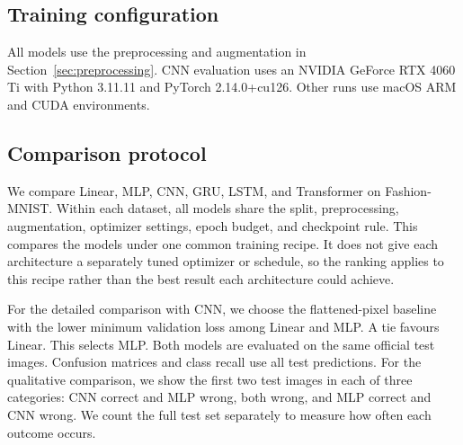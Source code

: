 \subsection{Training configuration}
\label{sec:training-setup}

All models use the preprocessing and augmentation in
Section~\ref{sec:preprocessing}. CNN evaluation uses an NVIDIA GeForce RTX 4060 Ti
with Python 3.11.11 and PyTorch 2.14.0+cu126. Other runs use macOS ARM and CUDA
environments.

\subsection{Comparison protocol}
\label{sec:experiment-design}
We compare Linear, MLP, CNN, GRU, LSTM, and Transformer on Fashion-MNIST.
Within each dataset, all models share the split, preprocessing, augmentation,
optimizer settings, epoch budget, and checkpoint rule. This compares the models
under one common training recipe. It does not give each architecture a separately
tuned optimizer or schedule, so the ranking applies to this recipe rather than
the best result each architecture could achieve.

For the detailed comparison with CNN, we choose the flattened-pixel baseline
with the lower minimum validation loss among Linear and MLP. A tie favours
Linear. This selects MLP. Both models are evaluated on the same official test
images. Confusion matrices and class recall use all test predictions.
For the qualitative comparison, we show the first two test images in each of
three categories: CNN correct and MLP wrong, both wrong, and MLP correct and CNN
wrong. We count the full test set separately to measure how often each outcome
occurs.
